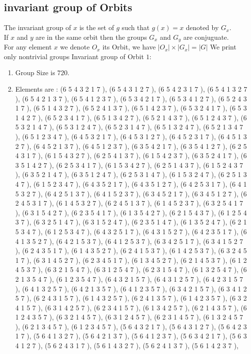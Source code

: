 \documentclass[12pt]{article}
\begin{document}
\subsection{invariant group of Orbits}
\noindent The invariant group of $x$ is the set of $g$ such that $g(x)=x$ denoted by $G_x$.\\
If $x$ and $y$ are in the same orbit then the groups $G_x$ and  $G_y$ are conjuguate.\\
For any element $x$ we denote $O_x$ its Orbit, we have $|O_x|\times |G_x|=|G|$
We print only nontrivial groups
Invariant group of Orbit $1$:
\begin{enumerate}
\item Group Size is $720$.
\item Elements are : (6 5 4 3 2 1 7  ), (6 5 4 3 1 2 7  ), (6 5 4 2 3 1 7  ), (6 5 4 1 3 2 7  ), (6 5 4 2 1 3 7  ), (6 5 4 1 2 3 7  ), (6 5 3 4 2 1 7  ), (6 5 3 4 1 2 7  ), (6 5 2 4 3 1 7  ), (6 5 1 4 3 2 7  ), (6 5 2 4 1 3 7  ), (6 5 1 4 2 3 7  ), (6 5 3 2 4 1 7  ), (6 5 3 1 4 2 7  ), (6 5 2 3 4 1 7  ), (6 5 1 3 4 2 7  ), (6 5 2 1 4 3 7  ), (6 5 1 2 4 3 7  ), (6 5 3 2 1 4 7  ), (6 5 3 1 2 4 7  ), (6 5 2 3 1 4 7  ), (6 5 1 3 2 4 7  ), (6 5 2 1 3 4 7  ), (6 5 1 2 3 4 7  ), (6 4 5 3 2 1 7  ), (6 4 5 3 1 2 7  ), (6 4 5 2 3 1 7  ), (6 4 5 1 3 2 7  ), (6 4 5 2 1 3 7  ), (6 4 5 1 2 3 7  ), (6 3 5 4 2 1 7  ), (6 3 5 4 1 2 7  ), (6 2 5 4 3 1 7  ), (6 1 5 4 3 2 7  ), (6 2 5 4 1 3 7  ), (6 1 5 4 2 3 7  ), (6 3 5 2 4 1 7  ), (6 3 5 1 4 2 7  ), (6 2 5 3 4 1 7  ), (6 1 5 3 4 2 7  ), (6 2 5 1 4 3 7  ), (6 1 5 2 4 3 7  ), (6 3 5 2 1 4 7  ), (6 3 5 1 2 4 7  ), (6 2 5 3 1 4 7  ), (6 1 5 3 2 4 7  ), (6 2 5 1 3 4 7  ), (6 1 5 2 3 4 7  ), (6 4 3 5 2 1 7  ), (6 4 3 5 1 2 7  ), (6 4 2 5 3 1 7  ), (6 4 1 5 3 2 7  ), (6 4 2 5 1 3 7  ), (6 4 1 5 2 3 7  ), (6 3 4 5 2 1 7  ), (6 3 4 5 1 2 7  ), (6 2 4 5 3 1 7  ), (6 1 4 5 3 2 7  ), (6 2 4 5 1 3 7  ), (6 1 4 5 2 3 7  ), (6 3 2 5 4 1 7  ), (6 3 1 5 4 2 7  ), (6 2 3 5 4 1 7  ), (6 1 3 5 4 2 7  ), (6 2 1 5 4 3 7  ), (6 1 2 5 4 3 7  ), (6 3 2 5 1 4 7  ), (6 3 1 5 2 4 7  ), (6 2 3 5 1 4 7  ), (6 1 3 5 2 4 7  ), (6 2 1 5 3 4 7  ), (6 1 2 5 3 4 7  ), (6 4 3 2 5 1 7  ), (6 4 3 1 5 2 7  ), (6 4 2 3 5 1 7  ), (6 4 1 3 5 2 7  ), (6 4 2 1 5 3 7  ), (6 4 1 2 5 3 7  ), (6 3 4 2 5 1 7  ), (6 3 4 1 5 2 7  ), (6 2 4 3 5 1 7  ), (6 1 4 3 5 2 7  ), (6 2 4 1 5 3 7  ), (6 1 4 2 5 3 7  ), (6 3 2 4 5 1 7  ), (6 3 1 4 5 2 7  ), (6 2 3 4 5 1 7  ), (6 1 3 4 5 2 7  ), (6 2 1 4 5 3 7  ), (6 1 2 4 5 3 7  ), (6 3 2 1 5 4 7  ), (6 3 1 2 5 4 7  ), (6 2 3 1 5 4 7  ), (6 1 3 2 5 4 7  ), (6 2 1 3 5 4 7  ), (6 1 2 3 5 4 7  ), (6 4 3 2 1 5 7  ), (6 4 3 1 2 5 7  ), (6 4 2 3 1 5 7  ), (6 4 1 3 2 5 7  ), (6 4 2 1 3 5 7  ), (6 4 1 2 3 5 7  ), (6 3 4 2 1 5 7  ), (6 3 4 1 2 5 7  ), (6 2 4 3 1 5 7  ), (6 1 4 3 2 5 7  ), (6 2 4 1 3 5 7  ), (6 1 4 2 3 5 7  ), (6 3 2 4 1 5 7  ), (6 3 1 4 2 5 7  ), (6 2 3 4 1 5 7  ), (6 1 3 4 2 5 7  ), (6 2 1 4 3 5 7  ), (6 1 2 4 3 5 7  ), (6 3 2 1 4 5 7  ), (6 3 1 2 4 5 7  ), (6 2 3 1 4 5 7  ), (6 1 3 2 4 5 7  ), (6 2 1 3 4 5 7  ), (6 1 2 3 4 5 7  ), (5 6 4 3 2 1 7  ), (5 6 4 3 1 2 7  ), (5 6 4 2 3 1 7  ), (5 6 4 1 3 2 7  ), (5 6 4 2 1 3 7  ), (5 6 4 1 2 3 7  ), (5 6 3 4 2 1 7  ), (5 6 3 4 1 2 7  ), (5 6 2 4 3 1 7  ), (5 6 1 4 3 2 7  ), (5 6 2 4 1 3 7  ), (5 6 1 4 2 3 7  ), 
\end{enumerate}
\end{document}
